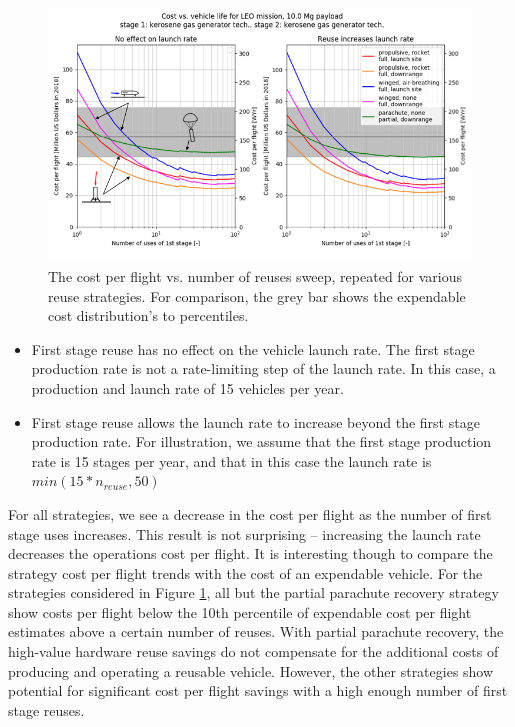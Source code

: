 \documentclass[conf]{new-aiaa}
\begin{document}
\begin{multicols}{2}
\begin{figure}
    \centering
    \includegraphics[width=\textwidth]{n_reuse_sweep_LEO_kerosene_annotated}
    \caption{\label{fig:num_reuse_sweep_LEO_kerosene} The cost per flight vs. number of reuses sweep, repeated for various reuse strategies. For comparison, the grey bar shows the expendable cost distribution's  to  percentiles.}
\end{figure}

\begin{itemize}
  \item First stage reuse has no effect on the vehicle launch rate. The first stage production rate is not a rate-limiting step of the launch rate. In this case, a production and launch rate of 15 vehicles per year. 
  \item First stage reuse allows the launch rate to increase beyond the first stage production rate. For illustration, we assume that the first stage production rate is 15 stages per year, and that in this case the launch rate is $min(15 * n_{reuse}, 50)$
\end{itemize}


For all strategies, we see a decrease in the cost per flight as the number of first stage uses increases. This result is not surprising -- increasing the launch rate decreases the operations cost per flight. It is interesting though to compare the strategy cost per flight trends with the cost of an expendable vehicle. For the strategies considered in Figure \ref{fig:num_reuse_sweep_LEO_kerosene}, all but the partial parachute recovery strategy show costs per flight below the 10th percentile of expendable cost per flight estimates above a certain number of reuses. With partial parachute recovery, the high-value hardware reuse savings do not compensate for the additional costs of producing and operating a reusable vehicle. However, the other strategies show potential for significant cost per flight savings with a high enough number of first stage reuses. 


\end{multicols}
\end{document}
